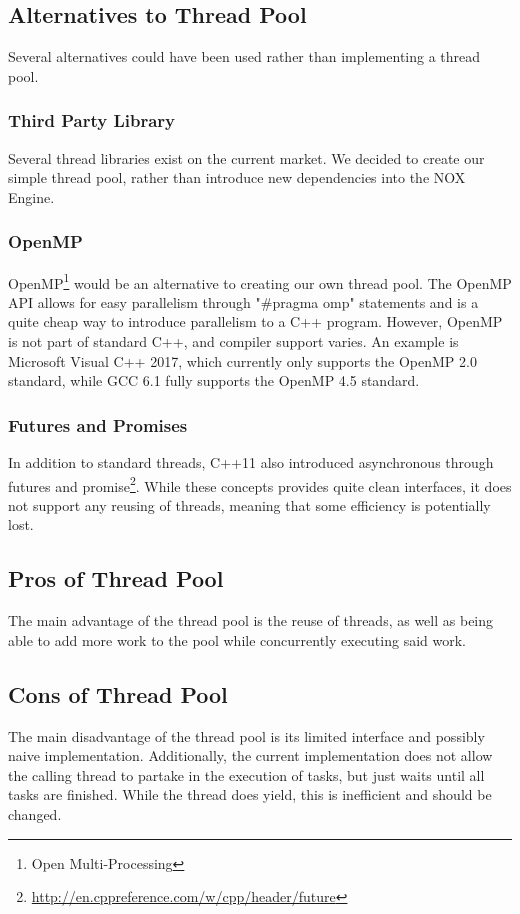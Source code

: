 \subsection{Alternatives to Thread Pool}
Several alternatives could have been used rather than implementing a thread pool.

\subsubsection{Third Party Library}
Several thread libraries exist on the current market.
We decided to create our simple thread pool, rather than introduce new dependencies into the NOX Engine.

\subsubsection{OpenMP}
OpenMP\footnote{Open Multi-Processing} would be an alternative to creating our own thread pool.
The OpenMP API allows for easy parallelism through "\#pragma omp" statements and is a quite cheap way to introduce
parallelism to a C++ program. However, OpenMP is not part of standard C++, and compiler support varies.
An example is Microsoft Visual C++ 2017, which currently only supports the OpenMP 2.0 standard\cite{microsoft_openmp_support},
while GCC 6.1 fully supports the OpenMP 4.5 standard\cite{gcc_openmp_support}.

\subsubsection{Futures and Promises}
In addition to standard threads, C++11 also introduced asynchronous through futures and promise\footnote{\url{http://en.cppreference.com/w/cpp/header/future}}.
While these concepts provides quite clean interfaces, it does not support any reusing of threads, meaning that some efficiency is potentially lost.

\subsection{Pros of Thread Pool}
The main advantage of the thread pool is the reuse of threads, as well as being able to add more work to the pool while concurrently executing said work.

\subsection{Cons of Thread Pool}
The main disadvantage of the thread pool is its limited interface and possibly naive implementation.
Additionally, the current implementation does not allow the calling thread to partake in the execution of tasks,
but just waits until all tasks are finished.
While the thread does yield, this is inefficient and should be changed.
